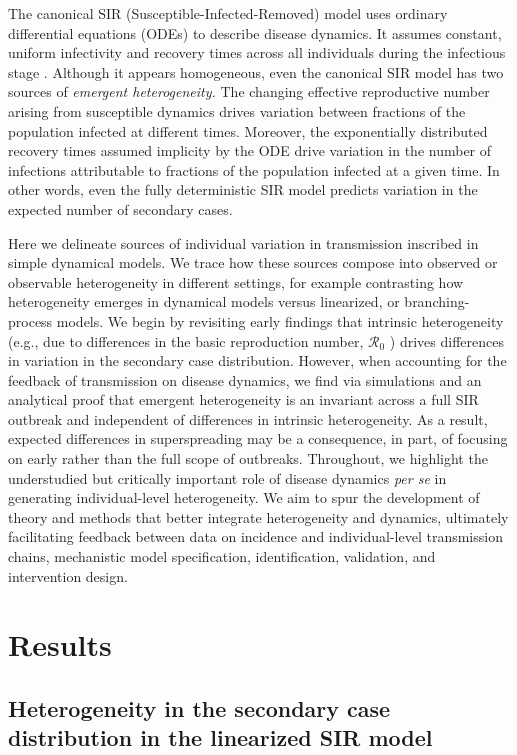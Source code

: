 The canonical SIR (Susceptible-Infected-Removed) model uses ordinary differential equations (ODEs) to describe disease dynamics. It assumes constant, uniform infectivity and recovery times across all individuals during the infectious stage \cite{hethcote2000mathematics, kermack1927contribution}. Although it appears homogeneous, even the canonical SIR model has two sources of \emph{emergent heterogeneity.} The changing effective reproductive number arising from susceptible dynamics drives variation between fractions of the population infected at different times. Moreover, the exponentially distributed recovery times assumed implicity by the ODE drive variation in the number of infections attributable to fractions of the population infected at a given time. In other words, even the fully deterministic SIR model predicts variation in the expected number of secondary cases.

Here we delineate sources of individual variation in transmission inscribed in simple dynamical models. We trace how these sources compose into observed or observable heterogeneity in different settings, for example contrasting how heterogeneity emerges in dynamical models versus linearized, or branching-process models. We begin by revisiting early findings that intrinsic heterogeneity (e.g., due to differences in the basic reproduction number, $\mathcal{R}_0$ ) drives differences in variation in the secondary case distribution. However, when accounting for the feedback of transmission on disease dynamics, we find via simulations and an analytical proof that emergent heterogeneity is an invariant across a full SIR outbreak and independent of differences in intrinsic heterogeneity. As a result, expected differences in superspreading may be a consequence, in part, of focusing on early rather than the full scope of outbreaks.  Throughout, we highlight the understudied but critically important role of disease dynamics \textit{per se} in generating individual-level heterogeneity. We aim to spur the development of theory and methods that better integrate heterogeneity and dynamics, ultimately facilitating feedback between data on incidence and individual-level transmission chains, mechanistic model specification, identification, validation, and intervention design.

\section{Results}

\subsection{Heterogeneity in the secondary case distribution in the linearized SIR model}

